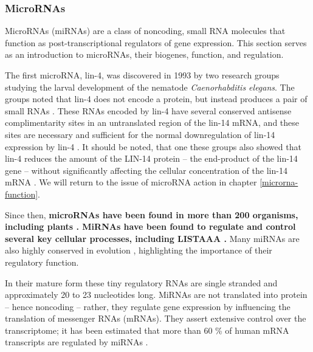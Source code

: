 \subsubsection{MicroRNAs}\label{micrornas}

MicroRNAs (miRNAs) are a class of noncoding, small RNA molecules that function
as post-transcriptional regulators of gene expression. This section serves as
an introduction to microRNAs, their biogenes, function, and regulation.

The first microRNA, lin-4, was discovered in 1993 by two research groups
studying the larval development of the nematode \emph{Caenorhabditis elegans}.
The groups noted that lin-4 does not encode a protein, but instead produces a
pair of small RNAs \citep{Lee1993}. These RNAs encoded by lin-4 have several
conserved antisense complimentarity sites in an untranslated region of the
lin-14 mRNA, and these sites are necessary and sufficient for the normal
downregulation of lin-14 expression by lin-4 \citep{Lee1993,Wightman1993}. It
should be noted, that one these groups also showed that lin-4 reduces the
amount of the LIN-14 protein -- the end-product of the lin-14 gene -- without
significantly affecting the cellular concentration of the lin-14 mRNA
\citep{??}. We will return to the issue of microRNA action in chapter
\ref{microrna-function}.

Since then,
\textbf{microRNAs have been found in more than 200 organisms, including plants
\citep{CITE}. MiRNAs have been found to regulate and control several key cellular
processes, including LISTAAA \citep{CITE}.} Many miRNAs are also highly
conserved in evolution \citep{Bartel2004}, highlighting the importance of
their regulatory function.

In their mature form these tiny regulatory RNAs are single stranded and
approximately 20 to 23 nucleotides long. MiRNAs are not translated into
protein -- hence noncoding -- rather, they regulate gene expression by
influencing the translation of messenger RNAs (mRNAs). They assert
extensive control over the transcriptome; it has been estimated that more
than 60 \% of human mRNA transcripts are regulated by miRNAs
\citep{CITE}.

